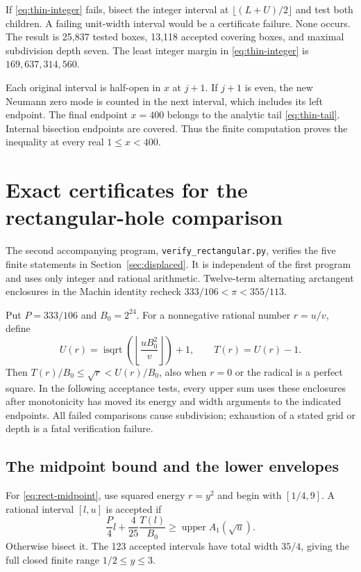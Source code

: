 \documentclass[11pt,reqno]{amsart}
\numberwithin{equation}{section}
\begin{document}
If \eqref{eq:thin-integer} fails, bisect the integer
interval at $\lfloor(L+U)/2\rfloor$ and test both
children. A failing unit-width interval would be a
certificate failure. None occurs. The result is
25,837 tested boxes, 13,118 accepted covering boxes,
and maximal subdivision depth seven. The least integer
margin in \eqref{eq:thin-integer} is
$169{,}637{,}314{,}560$.

Each original interval is half-open in $x$ at $j+1$.
If $j+1$ is even, the new Neumann zero mode is counted
in the next interval, which includes its left endpoint.
The final endpoint $x=400$ belongs to the analytic
tail \eqref{eq:thin-tail}. Internal bisection endpoints
are covered. Thus the finite computation proves the
inequality at every real $1\le x<400$.

\section{Exact certificates for the rectangular-hole comparison}\label{app:displaced-certificate}

The second accompanying program, \texttt{verify\_rectangular.py},
verifies the five finite statements in Section~\ref{sec:displaced}.
It is independent of the first program and uses only integer and
rational arithmetic. Twelve-term alternating arctangent enclosures
in the Machin identity recheck
$333/106<\pi<355/113$.

Put $P=333/106$ and $B_0=2^{24}$. For a nonnegative rational
number $r=u/v$, define
\begin{equation}\label{eq:rect-root-enclosure}
 U(r)=\operatorname{isqrt}\left(\left\lfloor
                  \frac{uB_0^2}{v}\right\rfloor\right)+1,
 \qquad T(r)=U(r)-1.
\end{equation}
Then $T(r)/B_0\le\sqrt r<U(r)/B_0$, also when $r=0$
or the radical is a perfect square. In the following acceptance
tests, every upper sum uses these enclosures after monotonicity
has moved its energy and width arguments to the indicated
endpoints. All failed comparisons cause subdivision; exhaustion
of a stated grid or depth is a fatal verification failure.

\subsection*{The midpoint bound and the lower envelopes}

For \eqref{eq:rect-midpoint}, use squared energy $r=y^2$ and
begin with $[1/4,9]$. A rational interval $[l,u]$ is accepted if
\begin{equation}\label{eq:rect-midpoint-box}
 \frac P4l+\frac4{25}\frac{T(l)}{B_0}
 \ge\operatorname{upper}A_1(\sqrt u).
\end{equation}
Otherwise bisect it. The 123 accepted intervals have total
width $35/4$, giving the full closed finite range
$1/2\le y\le3$.
\end{document}
